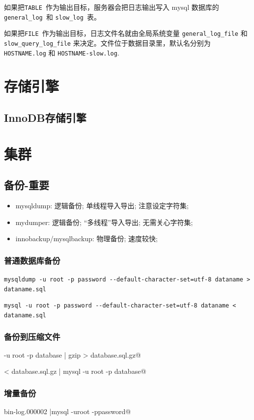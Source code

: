 \documentclass[UTF8,a4paper,12pt]{ctexbook}
\begin{document}
		如果把\verb|TABLE |作为输出目标，服务器会把日志输出写入 mysql 数据库的 \verb|general_log |和 \verb|slow_log |表。
		
		如果把\verb|FILE |作为输出目标，日志文件名就由全局系统变量 \verb|general_log_file| 和 \verb|slow_query_log_file| 来决定。文件位于数据目录里，默认名分别为 \verb|HOSTNAME.log| 和 \verb|HOSTNAME-slow.log|.
		
\chapter{存储引擎}
	\section{InnoDB存储引擎}	
	
	
\chapter{集群} 
	\section{备份-重要}
		\begin{itemize}
			\item mysqldump: 逻辑备份; 单线程导入导出; 注意设定字符集; 
			\item mydumper: 逻辑备份; “多线程”导入导出; 无需关心字符集;
			\item innobackup/mysqlbackup: 物理备份; 速度较快;
		\end{itemize}
		\subsection{普通数据库备份}
			\verb|mysqldump -u root -p password --default-character-set=utf-8 dataname > dataname.sql|
			
			\verb|mysql -u root -p password --default-character-set=utf-8 dataname < dataname.sql|
		\subsection{备份到压缩文件}
			\verb@mysqldump -u root -p database | gzip > database.sql.gz@
			
			\verb@gzip < database.sql.gz | mysql -u root -p database@
		\subsection{增量备份}
			\verb@mysqlbinlog bin-log.000002 |mysql -uroot -ppassword@
		
\end{document}
